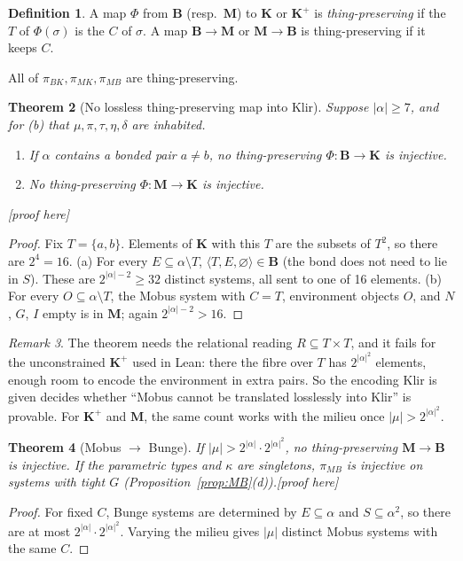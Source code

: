 \documentclass[11pt]{article}
\newtheorem{theorem}{Theorem}
\theoremstyle{definition}
\newtheorem{definition}[theorem]{Definition}
\theoremstyle{remark}
\newtheorem{remark}[theorem]{Remark}
\newcommand{\K}{\mathbf{K}}
\newcommand{\Kp}{\mathbf{K}^{+}}
\newcommand{\B}{\mathbf{B}}
\newcommand{\M}{\mathbf{M}}
\newcommand{\status}[1]{\hfill\textsf{\small[#1]}}
\newcommand{\pBK}{\pi_{BK}}
\newcommand{\pMB}{\pi_{MB}}
\newcommand{\pMK}{\pi_{MK}}
\begin{document}
\begin{definition}
A map $\Phi$ from $\B$ (resp.\ $\M$) to $\K$ or $\Kp$ is \emph{thing-preserving} if the $T$ of $\Phi(\sigma)$ is the $C$ of $\sigma$. A map $\B\to\M$ or $\M\to\B$ is thing-preserving if it keeps $C$.
\end{definition}

All of $\pBK,\pMK,\pMB$ are thing-preserving.

\begin{theorem}[No lossless thing-preserving map into Klir]\label{thm:nolossless}
Suppose $|\alpha|\ge 7$, and for (b) that $\mu,\pi,\tau,\eta,\delta$ are inhabited.
\begin{enumerate}[label=(\alph*),nosep]
\item If $\alpha$ contains a bonded pair $a\neq b$, no thing-preserving $\Phi:\B\to\K$ is injective.
\item No thing-preserving $\Phi:\M\to\K$ is injective.
\end{enumerate}\status{proof here}
\end{theorem}
\begin{proof}
Fix $T=\{a,b\}$. Elements of $\K$ with this $T$ are the subsets of $T^2$, so there are $2^4=16$. (a) For every $E\subseteq\alpha\setminus T$, $\langle T,E,\varnothing\rangle\in\B$ (the bond does not need to lie in $S$). These are $2^{|\alpha|-2}\ge 32$ distinct systems, all sent to one of 16 elements. (b) For every $O\subseteq\alpha\setminus T$, the Mobus system with $C=T$, environment objects $O$, and $N$, $G$, $I$ empty is in $\M$; again $2^{|\alpha|-2}>16$.
\end{proof}

\begin{remark}
The theorem needs the relational reading $R\subseteq T\times T$, and it fails for the unconstrained $\Kp$ used in Lean: there the fibre over $T$ has $2^{|\alpha|^2}$ elements, enough room to encode the environment in extra pairs. So the encoding Klir is given decides whether ``Mobus cannot be translated losslessly into Klir'' is provable. For $\Kp$ and $\M$, the same count works with the milieu once $|\mu|>2^{|\alpha|^2}$.
\end{remark}

\begin{theorem}[Mobus $\to$ Bunge]\label{thm:MBloss}
If $|\mu|>2^{|\alpha|}\cdot 2^{|\alpha|^2}$, no thing-preserving $\M\to\B$ is injective. If the parametric types and $\kappa$ are singletons, $\pMB$ is injective on systems with tight $G$ (Proposition~\ref{prop:MB}(d)).\status{proof here}
\end{theorem}
\begin{proof}
For fixed $C$, Bunge systems are determined by $E\subseteq\alpha$ and $S\subseteq\alpha^2$, so there are at most $2^{|\alpha|}\cdot 2^{|\alpha|^2}$. Varying the milieu gives $|\mu|$ distinct Mobus systems with the same $C$.
\end{proof}
\end{document}
